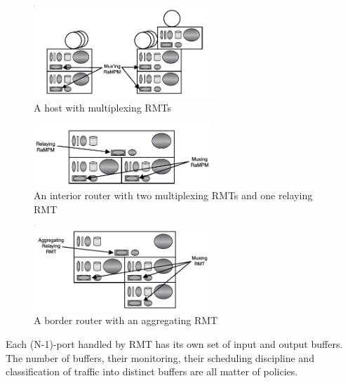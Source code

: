            \begin{figure}[H]
                \begin{center}
                    \includegraphics[width=0.6\textwidth]{fig/fwding_rmt-mux.png}
                  \caption{A host with multiplexing RMTs}
                  \label{fig:rmt2}
                \end{center}
            \end{figure}
            \begin{figure}[H]
                \begin{center}
                    \includegraphics[width=0.6\textwidth]{fig/fwding_rmt-relay.png}
                  \caption{An interior router with two multiplexing RMTs and one relaying RMT}
                  \label{fig:rmt3}
                \end{center}
            \end{figure}
            \begin{figure}[H]
                \begin{center}
                    \includegraphics[width=0.6\textwidth]{fig/fwding_rmt-agg.png}
                  \caption{A border router with an aggregating RMT}
                  \label{fig:rmt4}
                \end{center}
            \end{figure}

            Each (N-1)-port handled by RMT has its own set of input and output buffers. The number of buffers, their monitoring, their scheduling discipline and classification of traffic into distinct buffers are all matter of policies.

